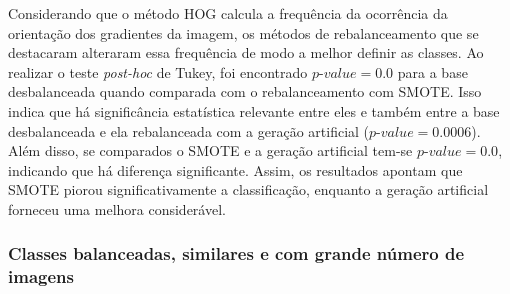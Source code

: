
Considerando que o método HOG calcula a frequência da ocorrência da orientação dos gradientes da imagem, os métodos de rebalanceamento que se destacaram alteraram essa frequência de modo a melhor definir as classes. Ao realizar o teste \textit{post-hoc} de Tukey, foi encontrado $\textit{p-value} = 0.0$ para a base desbalanceada quando comparada com o rebalanceamento com SMOTE. Isso indica que há significância estatística relevante entre eles e também entre a base desbalanceada e ela rebalanceada com a geração artificial ($\textit{p-value} = 0.0006$). Além disso, se comparados o SMOTE e a geração artificial tem-se $\textit{p-value} = 0.0$, indicando que há diferença significante. Assim, os resultados apontam que SMOTE piorou significativamente a classificação, enquanto a geração artificial forneceu uma melhora considerável.

\subsubsection{Classes balanceadas, similares e com grande número de imagens}


